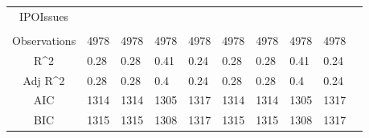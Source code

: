 \documentclass{article}
\begin{document}
\begin{table}[H]
\begin{tabular}{|clllllllll|}
  IPOIssues &  &  &  &  &  &  &  &  & \\ 
   &  &  &  &  &  &  &  &  & \\ 
  \hline 
 Observations & 4978 & 4978 & 4978 & 4978 & 4978 & 4978 & 4978 & 4978 & \\ 
  R^2 & 0.28 & 0.28 & 0.41 & 0.24 & 0.28 & 0.28 & 0.41 & 0.24 & \\ 
  Adj R^2 & 0.28 & 0.28 & 0.4 & 0.24 & 0.28 & 0.28 & 0.4 & 0.24 & \\ 
  AIC & 1314 & 1314 & 1305 & 1317 & 1314 & 1314 & 1305 & 1317 & \\ 
  BIC & 1315 & 1315 & 1308 & 1317 & 1315 & 1315 & 1308 & 1317 & \\ 
   \hline
\end{tabular}
 
\end{table}
\end{document}
